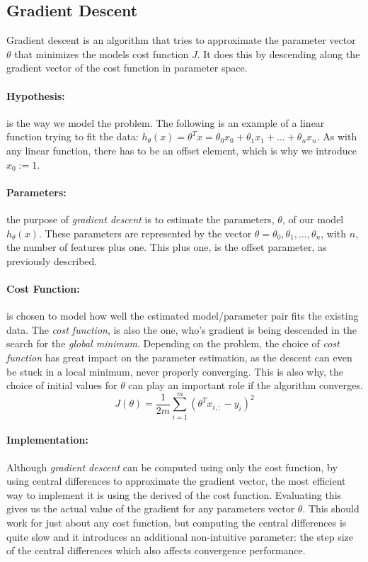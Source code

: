 \documentclass[11pt,a4paper]{article}
\begin{document}
\subsection{Gradient Descent}
Gradient descent is an algorithm that tries to approximate the parameter vector $\theta$ that minimizes the models cost function $J$.
It does this by descending along the gradient vector of the cost function in parameter space.
\paragraph{Hypothesis:} is the way we model the problem. 
The following is an example of a linear function trying to fit the data: $h_\theta(x) = \theta^Tx = \theta_0x_0 + \theta_1x_1 + \ldots + \theta_nx_n$.
As with any linear function, there has to be an offset element, which is why we introduce $x_0:=1$.

\paragraph{Parameters:} the purpose of \emph{gradient descent} is to estimate the parameters, $\theta$, of our model $h_\theta(x)$.
These parameters are represented by the vector $\theta
= \theta_0, \theta_1, \ldots, \theta_n$, with $n$, the number of features plus one.
This plus one, is the offset parameter, as previously described.

\paragraph{Cost Function:} is chosen to model how well the estimated model/parameter pair fits the existing data.
The \emph{cost function}, is also the one, who's gradient is being descended in the search for the \emph{global minimum}.
Depending on the problem, the choice of \emph{cost function} has great impact on the parameter estimation, as the descent can even be stuck in a local minimum, never properly converging.
This is also why, the choice of initial values for $\theta$ can play an important role if the algorithm converges.
\begin{equation}
J(\theta)=\frac{1}{2m}\sum\limits_{i=1}^m(\theta^Tx_{i,:}-y_i)^2
\end{equation}

\paragraph{Implementation:}
Although \emph{gradient descent} can be computed using only the cost function, by using central differences to approximate the gradient vector, the most efficient way to implement it is using the derived of the cost function. 
Evaluating this gives us the actual value of the gradient for any parameters vector $\theta$.
This should work for just about any cost function, but computing the central differences is quite slow and it introduces an additional non-intuitive parameter: the step size of the central differences which also affects convergence performance.
\end{document}

